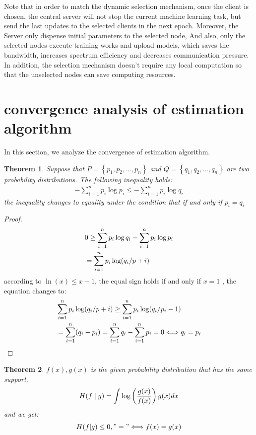 \documentclass[conference]{IEEEtran}
\newtheorem{theorem}{Theorem}
\begin{document}
Note that in order to match the dynamic selection mechanism, once the client is chosen, 
the central server will not stop the current machine learning task, but send the last updates
to the selected clients in the next epoch. Moreover, the Server only dispense initial parameters to the selected node,
And also, only the selected nodes execute training works and upload models, which 
saves the bandwidth, increases spectrum efficiency and decreases communication pressure. 
In addition, the selection mechanism doesn't require any local computation so that the 
unselected nodes can save computing resources. 

\section{convergence analysis of estimation algorithm}
In this section, we analyze the convergence of estimation algorithm.
\begin{theorem}
Suppose that $P = \left\{p_1,p_2,\dots ,p_n\right\}$ 
and $Q = \left\{q_1,q_2,\dots ,q_n\right\}$ are two probability distributions.
The following inequality holds:
\begin{align}
    -\sum_{i=1}^{n}p_i \log p_i \le -\sum_{i=1}^{n}p_i \log q_i
\end{align}
the inequality changes to equality under the condition that if and only if  $p_i = q_i$
\end{theorem}
\begin{proof}
    \begin{align}
    &0 \ge \sum_{i=1}^{n}p_i \log q_i - \sum_{i=1}^{n}p_i \log p_i \notag \\
    &= \sum_{i=1}^{n} p_i \log (q_i/p+i)
    \end{align}
    according to $\ln (x) \le x-1$, the equal sign holds if and only if $x = 1$ , 
    the equation changes to:
    \begin{align}
    &\sum_{i=1}^{n} p_i \log (q_i/p+i) \ge \sum_{i=1}^{n} p_i \log (q_i/p_i-1) \notag \\
    &= \sum_{i=1}^{n} (q_i-p_i) = \sum_{i=1}^{n} q_i - \sum_{i=1}^{n} p_i = 0 \Longleftrightarrow q_i = p_i
    \end{align}
    \end{proof}
\begin{theorem}
$f(x), g(x)$ is the given probability distribution that has the same support.
\begin{align}
    H(f \mid g)=\int \log \left(\frac{g(x)}{f(x)}\right) g(x) d x \notag
\end{align}
and we get:
\begin{align}
    H(f|g) \le 0, "=" \Longleftrightarrow f(x) = g(x) \notag
\end{align}
\end{theorem}
\end{document}
